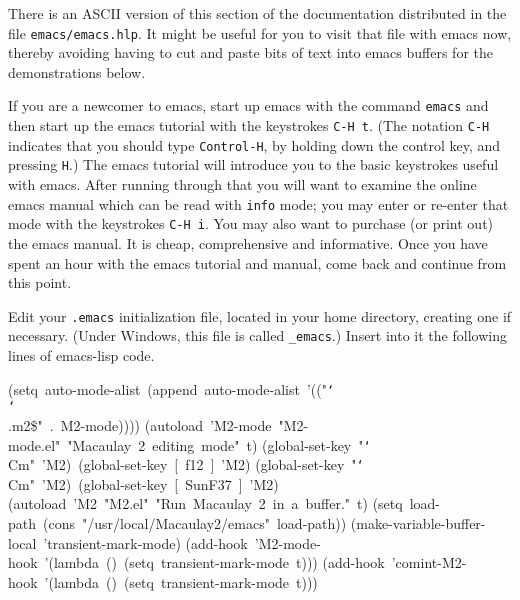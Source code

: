 There is an ASCII version of this section of the documentation distributed
in the file {\tt {}emacs/emacs.hlp}.  It might be useful for you to visit
that file with emacs now, thereby avoiding having to cut and paste bits of
text into emacs buffers for the demonstrations below.

If you are a newcomer to emacs, start up emacs with the command 
{\tt {}emacs} and then start up the emacs tutorial with the keystrokes 
{\tt {}C-H\ t}.  (The notation {\tt {}C-H} indicates that you should type 
{\tt {}Control-H}, by holding down the control key, 
and pressing {\tt {}H}.)  The emacs tutorial will introduce you to the
basic keystrokes useful with emacs.  After running through that you will want
to examine the online emacs manual which can be read with {\tt {}info}
mode; you may enter or re-enter that mode with the keystrokes {\tt {}C-H\ i}.  
You may also want to purchase (or print out) the emacs manual.  It is cheap,
comprehensive and informative.  Once you have spent an hour with the emacs
tutorial and manual, come back and continue from this point.

Edit your {\tt {}.emacs} initialization file, located in your home directory,
creating one if necessary.  (Under Windows, this file is called {\tt {}\_emacs}.)
Insert into it the following lines of emacs-lisp code.

\medskip

{\scriptsize\ttfamily\obeylines
(setq~auto-mode-alist~(append~auto-mode-alist~'(("{\tt\char`\\}{\tt\char`\\}.m2\$"~.~M2-mode))))
(autoload~'M2-mode~"M2-mode.el"~"Macaulay~2~editing~mode"~t)
(global-set-key~"{\tt\char`\\}{}Cm"~'M2)~(global-set-key~[~f12~]~'M2)
(global-set-key~"{\tt\char`\\}{}Cm"~'M2)~(global-set-key~[~SunF37~]~'M2)
(autoload~'M2~"M2.el"~"Run~Macaulay~2~in~a~buffer."~t)
(setq~load-path~(cons~"/usr/local/Macaulay2/emacs"~load-path))
(make-variable-buffer-local~'transient-mark-mode)
(add-hook~'M2-mode-hook~'(lambda~()~(setq~transient-mark-mode~t)))
(add-hook~'comint-M2-hook~'(lambda~()~(setq~transient-mark-mode~t)))
}

\smallskip

